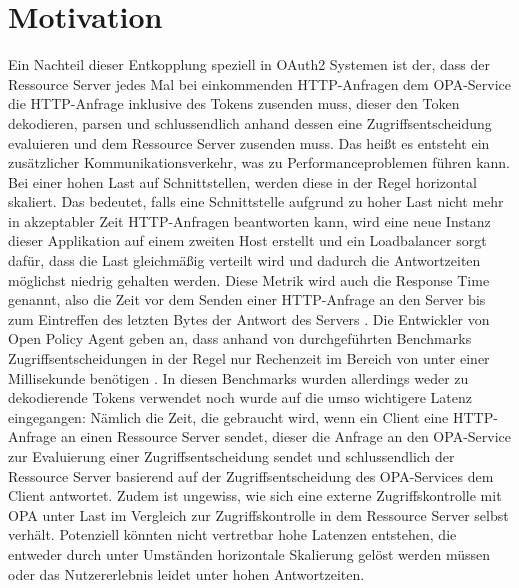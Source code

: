 \section{Motivation}
\label{sec:intro:motivation}
Ein Nachteil dieser Entkopplung speziell in OAuth2 Systemen ist der, dass der Ressource Server jedes Mal bei einkommenden HTTP-Anfragen dem OPA-Service die HTTP-Anfrage inklusive des Tokens zusenden muss, dieser den Token dekodieren, parsen und schlussendlich anhand dessen eine Zugriffsentscheidung evaluieren und dem Ressource Server zusenden muss. Das heißt es entsteht ein zusätzlicher Kommunikationsverkehr, was zu Performanceproblemen führen kann. Bei einer hohen Last auf Schnittstellen, werden diese in der Regel horizontal skaliert. Das bedeutet, falls eine Schnittstelle aufgrund zu hoher Last nicht mehr in akzeptabler Zeit HTTP-Anfragen beantworten kann, wird eine neue Instanz dieser Applikation auf einem zweiten Host erstellt und ein Loadbalancer sorgt dafür, dass die Last gleichmäßig verteilt wird und dadurch die Antwortzeiten möglichst niedrig gehalten werden. Diese Metrik wird auch die Response Time genannt, also die Zeit vor dem Senden einer HTTP-Anfrage an den Server bis zum Eintreffen des letzten Bytes der Antwort des Servers \citep{jmeterglossary:2021}. 
Die Entwickler von Open Policy Agent geben an, dass anhand von durchgeführten Benchmarks Zugriffsentscheidungen in der Regel nur Rechenzeit im Bereich von unter einer Millisekunde benötigen \citep{opaperformance:2021:07}. In diesen Benchmarks wurden allerdings weder zu dekodierende Tokens verwendet noch wurde auf die umso wichtigere Latenz eingegangen: Nämlich die Zeit, die gebraucht wird, wenn ein Client eine HTTP-Anfrage an einen Ressource Server sendet, dieser die Anfrage an den OPA-Service zur Evaluierung einer Zugriffsentscheidung sendet und schlussendlich der Ressource Server basierend auf der Zugriffsentscheidung des OPA-Services dem Client antwortet. Zudem ist ungewiss, wie sich eine externe Zugriffskontrolle mit OPA unter Last im Vergleich zur Zugriffskontrolle in dem Ressource Server selbst verhält. Potenziell könnten nicht vertretbar hohe Latenzen entstehen, die entweder durch unter Umständen horizontale Skalierung gelöst werden müssen oder das Nutzererlebnis leidet unter hohen Antwortzeiten.

%
%
